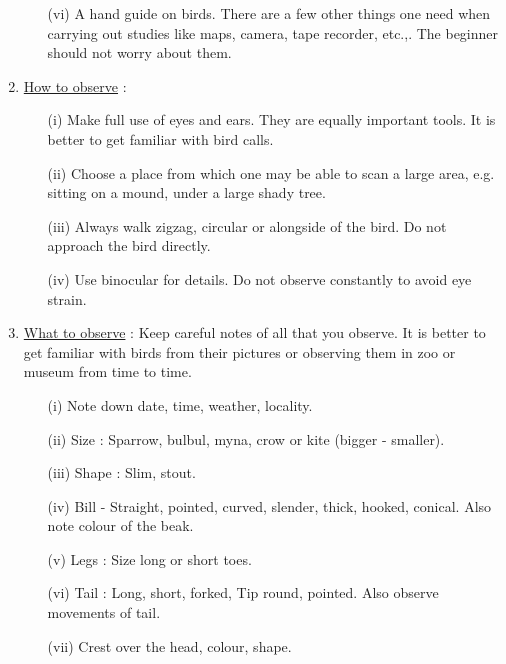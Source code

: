 \begin{enumerate}
\begin{itemize}
\item[(vi)] A hand guide on birds. There are a few other things one 
need when carrying out studies like maps, camera, tape 
recorder, etc.,. The beginner should not worry about 
them. 
\end{itemize}

\item \underline{How to observe} :
\begin{itemize}
\item[(i)] Make full use of eyes and ears. They are equally important 
tools. It is better to get familiar with bird calls. 

\item[(ii)] Choose a place from which one may be able to scan a 
large area, e.g. sitting on a mound, under a large 
shady tree. 

\item[(iii)] Always walk zigzag, circular or alongside of the bird. Do 
not approach the bird directly. 

\item[(iv)] Use binocular for details. Do not observe constantly to 
avoid eye strain. 
\end{itemize}

\item \underline{What to observe} : Keep careful notes of all that you observe. 
It is better to get familiar with birds from their 
pictures or observing them in zoo or museum from time to 
time. 
\begin{itemize}
\item[(i)] Note down date, time, weather, locality. 

\item[(ii)] Size  : Sparrow, bulbul, myna, crow or kite 
(bigger - smaller). 

\item[(iii)] Shape : Slim, stout. 

\item[(iv)] Bill - Straight, pointed, curved, slender, thick, 
hooked, conical. Also note colour of the beak.

\item[(v)] Legs : Size long or short toes. 

\item[(vi)] Tail : Long, short, forked, Tip round, pointed. Also 
observe movements of tail. 

\item[(vii)] Crest over the head, colour, shape. 


\end{itemize}
\end{enumerate}
